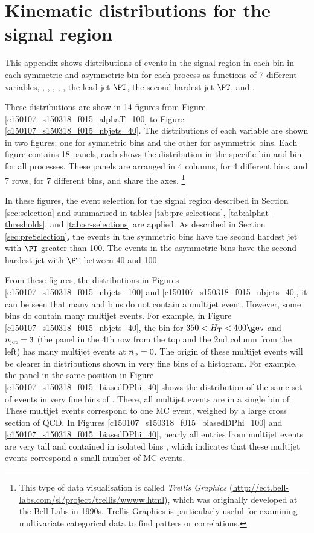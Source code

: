 \section{Kinematic distributions for the signal region}
\label{sec:kisigplot}

This appendix shows distributions of events in the signal region in
each \scalht bin in each symmetric and asymmetric \njet bin for each
process as functions of 7 different variables, \ie, \alphat, \mht,
\bdphi, \met, the lead jet $\PT$, the second hardest jet $\PT$, and
\nb.

These distributions are show in 14 figures from Figure
\ref{c150107_s150318_f015_alphaT_100} to Figure
\ref{c150107_s150318_f015_nbjets_40}. The distributions of each
variable are shown in two figures: one for symmetric \njet bins and
the other for asymmetric \njet bins. Each figure contains 18 panels,
each shows the distribution in the specific \scalht bin and \njet bin
for all processes. These panels are arranged in 4 columns, for 4
different \njet bins, and 7 rows, for 7 different \scalht bins, and
share the axes.
\footnote{This type of data visualisation is called \textit{Trellis
    Graphics}
  (\url{http://ect.bell-labs.com/sl/project/trellis/wwww.html}), which
  was originally developed at the Bell Labs in 1990s. Trellis Graphics
  is particularly useful for examining multivariate categorical data
  \eg to find patters or correlations.}


In these figures, the event selection for the signal region described
in Section \ref{sec:selection} and summarised in tables
\ref{tab:pre-selections}, \ref{tab:alphat-thresholds}, and
\ref{tab:sr-selections} are applied. As described in Section
\ref{sec:preSelection}, the events in the symmetric \njet bins have
the second hardest jet with $\PT$ greater than 100\gev. The events in
the asymmetric \njet bins have the second hardest jet with $\PT$
between 40 and 100\gev.

From these figures, \eg the \nb distributions in Figures
\ref{c150107_s150318_f015_nbjets_100} and
\ref{c150107_s150318_f015_nbjets_40}, it can be seen that many \scalht
and \njet bins do not contain a multijet event. However, some bins do
contain many multijet events. For example, in Figure
\ref{c150107_s150318_f015_nbjets_40}, the bin for $350 < \scalht <
400\gev$ and $n_{\text{jet}} = 3$ (the panel in the 4th row from the top and
the 2nd column from the left) has many multijet events at $n_{\text{b}} = 0$.
The origin of these multijet events will be clearer in distributions
shown in very fine bins of a histogram. For example, the panel in the
same position in Figure \ref{c150107_s150318_f015_biasedDPhi_40} shows
the distribution of the same set of events in very fine bins of
\bdphi. There, all multijet events are in a single bin of \bdphi.
These multijet events correspond to one MC event, weighed by a large
cross section of QCD. In Figures
\ref{c150107_s150318_f015_biasedDPhi_100} and
\ref{c150107_s150318_f015_biasedDPhi_40}, nearly all entries from
multijet events are very tall and contained in isolated bins \bdphi,
which indicates that these multijet events correspond a small number
of MC events.

